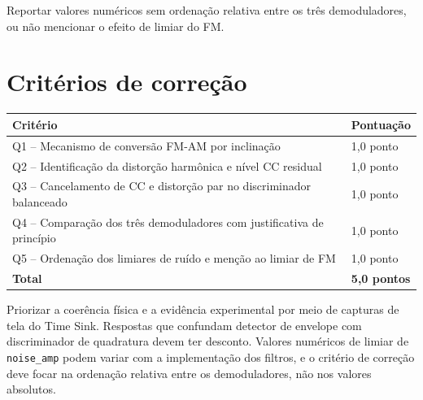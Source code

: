 \documentclass[11pt,a4paper]{article}
\begin{document}
\begin{enumerate}[label=\textbf{Q\arabic*.}, leftmargin=*, itemsep=1em]
    \begin{nota}
      Reportar valores numéricos sem ordenação relativa entre os três
      demoduladores, ou não mencionar o efeito de limiar do FM.
    \end{nota}

\end{enumerate}

\section*{Critérios de correção}
\begin{tabular}{ll}
  \toprule
  Critério & Pontuação \\
  \midrule
  Q1 -- Mecanismo de conversão FM-AM por inclinação                              & 1,0 ponto \\
  Q2 -- Identificação da distorção harmônica e nível CC residual                 & 1,0 ponto \\
  Q3 -- Cancelamento de CC e distorção par no discriminador balanceado           & 1,0 ponto \\
  Q4 -- Comparação dos três demoduladores com justificativa de princípio         & 1,0 ponto \\
  Q5 -- Ordenação dos limiares de ruído e menção ao limiar de FM                 & 1,0 ponto \\
  \midrule
  \textbf{Total} & \textbf{5,0 pontos} \\
  \bottomrule
\end{tabular}

\bigskip
\begin{nota}
  Priorizar a coerência física e a evidência experimental por meio de
  capturas de tela do Time Sink. Respostas que confundam detector de
  envelope com discriminador de quadratura devem ter desconto. Valores
  numéricos de limiar de \texttt{noise\_amp} podem variar com a
  implementação dos filtros, e o critério de correção deve focar na
  ordenação relativa entre os demoduladores, não nos valores absolutos.
\end{nota}
\end{document}
